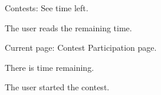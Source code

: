 \begin{uc}{Contests: See time left.}

    \begin{uc-mss}
    \item The user reads the remaining time.
    \end{uc-mss}

    \begin{uc-pre}
    \item Current page: Contest Participation page.
    \item There is time remaining.
    \end{uc-pre}

    \begin{uc-trig}
    The user started the contest.
    \end{uc-trig}

\end{uc}